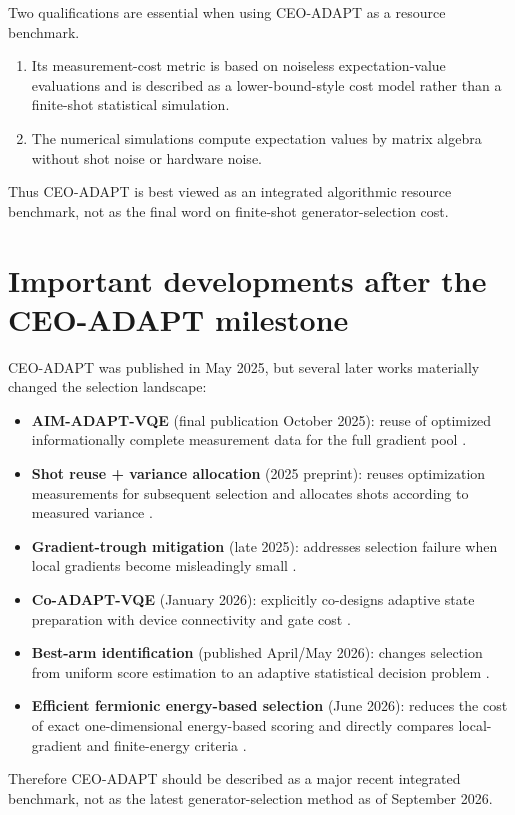 \documentclass[11pt]{article}
\begin{document}
Two qualifications are essential when using CEO-ADAPT as a resource benchmark.
\begin{enumerate}[leftmargin=2em]
    \item Its measurement-cost metric is based on noiseless expectation-value evaluations and is described as a lower-bound-style cost model rather than a finite-shot statistical simulation.
    \item The numerical simulations compute expectation values by matrix algebra without shot noise or hardware noise.
\end{enumerate}
Thus CEO-ADAPT is best viewed as an integrated algorithmic resource benchmark, not as the final word on finite-shot generator-selection cost.

\section{Important developments after the CEO-ADAPT milestone}

CEO-ADAPT was published in May 2025, but several later works materially changed the selection landscape:
\begin{itemize}[leftmargin=2em]
    \item \textbf{AIM-ADAPT-VQE} (final publication October 2025): reuse of optimized informationally complete measurement data for the full gradient pool \cite{Nykanen2025}.
    \item \textbf{Shot reuse + variance allocation} (2025 preprint): reuses optimization measurements for subsequent selection and allocates shots according to measured variance \cite{Ikhtiarudin2025}.
    \item \textbf{Gradient-trough mitigation} (late 2025): addresses selection failure when local gradients become misleadingly small \cite{Stadelmann2025}.
    \item \textbf{Co-ADAPT-VQE} (January 2026): explicitly co-designs adaptive state preparation with device connectivity and gate cost \cite{Ramoa2026CoDesign}.
    \item \textbf{Best-arm identification} (published April/May 2026): changes selection from uniform score estimation to an adaptive statistical decision problem \cite{Huang2026}.
    \item \textbf{Efficient fermionic energy-based selection} (June 2026): reduces the cost of exact one-dimensional energy-based scoring and directly compares local-gradient and finite-energy criteria \cite{Rossi2026}.
\end{itemize}
Therefore CEO-ADAPT should be described as a major recent integrated benchmark, not as the latest generator-selection method as of September 2026.
\end{document}
